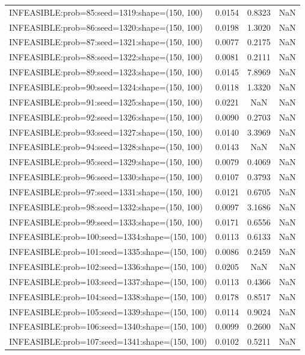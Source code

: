 \begin{longtable}{lccc}
INFEASIBLE:prob=85:seed=1319:shape=(150, 100)  & 0.0154 &  0.8323 &    NaN \\
INFEASIBLE:prob=86:seed=1320:shape=(150, 100)  & 0.0198 &  1.3020 &    NaN \\
INFEASIBLE:prob=87:seed=1321:shape=(150, 100)  & 0.0077 &  0.2175 &    NaN \\
INFEASIBLE:prob=88:seed=1322:shape=(150, 100)  & 0.0081 &  0.2111 &    NaN \\
INFEASIBLE:prob=89:seed=1323:shape=(150, 100)  & 0.0145 &  7.8969 &    NaN \\
INFEASIBLE:prob=90:seed=1324:shape=(150, 100)  & 0.0118 &  1.3320 &    NaN \\
INFEASIBLE:prob=91:seed=1325:shape=(150, 100)  & 0.0221 &     NaN &    NaN \\
INFEASIBLE:prob=92:seed=1326:shape=(150, 100)  & 0.0090 &  0.2703 &    NaN \\
INFEASIBLE:prob=93:seed=1327:shape=(150, 100)  & 0.0140 &  3.3969 &    NaN \\
INFEASIBLE:prob=94:seed=1328:shape=(150, 100)  & 0.0143 &     NaN &    NaN \\
INFEASIBLE:prob=95:seed=1329:shape=(150, 100)  & 0.0079 &  0.4069 &    NaN \\
INFEASIBLE:prob=96:seed=1330:shape=(150, 100)  & 0.0107 &  0.3793 &    NaN \\
INFEASIBLE:prob=97:seed=1331:shape=(150, 100)  & 0.0121 &  0.6705 &    NaN \\
INFEASIBLE:prob=98:seed=1332:shape=(150, 100)  & 0.0097 &  3.1686 &    NaN \\
INFEASIBLE:prob=99:seed=1333:shape=(150, 100)  & 0.0171 &  0.6556 &    NaN \\
INFEASIBLE:prob=100:seed=1334:shape=(150, 100) & 0.0113 &  0.6133 &    NaN \\
INFEASIBLE:prob=101:seed=1335:shape=(150, 100) & 0.0086 &  0.2459 &    NaN \\
INFEASIBLE:prob=102:seed=1336:shape=(150, 100) & 0.0205 &     NaN &    NaN \\
INFEASIBLE:prob=103:seed=1337:shape=(150, 100) & 0.0113 &  0.4366 &    NaN \\
INFEASIBLE:prob=104:seed=1338:shape=(150, 100) & 0.0178 &  0.8517 &    NaN \\
INFEASIBLE:prob=105:seed=1339:shape=(150, 100) & 0.0114 &  0.9024 &    NaN \\
INFEASIBLE:prob=106:seed=1340:shape=(150, 100) & 0.0099 &  0.2600 &    NaN \\
INFEASIBLE:prob=107:seed=1341:shape=(150, 100) & 0.0102 &  0.5211 &    NaN \\

\end{longtable}
